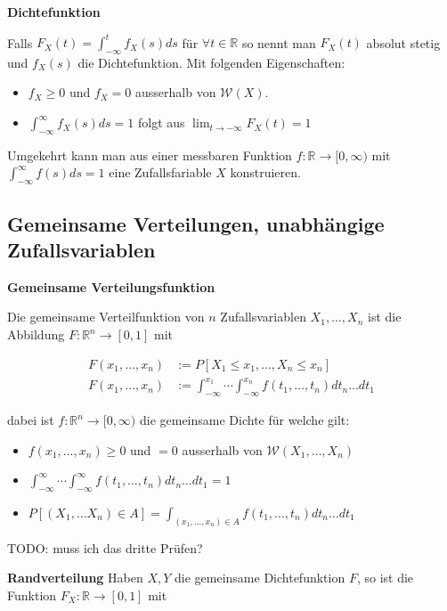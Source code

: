 \documentclass[25pt]{sciposter}
\newcommand{\R}{\mathbb{R}}
\newcommand{\W}{\mathcal{W}}
\newenvironment{method}[1]{\begin{mdframed}[backgroundcolor=blue!10,innertopmargin=15pt, innerbottommargin=15pt,nobreak=true]
		\textbf{#1 }
	}
	{ 
	\end{mdframed}
}
\begin{document}
\begin{multicols}{3}
\begin{method}{Dichtefunktion}
	Falls $F_X(t) = \int_{-\infty}^t f_X(s) ds$ für $\forall t\in\R$ so nennt man $F_X(t)$ absolut stetig und $f_X(s)$ die Dichtefunktion. Mit folgenden Eigenschaften:
	\begin{itemize}
		\item $f_X \geq 0$ und $f_X = 0$ ausserhalb von $\W(X)$.
		\item $\int_{-\infty}^\infty f_X(s) ds = 1$ folgt aus $\lim_{t \to -\infty}F_X(t) = 1$
	\end{itemize}

Umgekehrt kann man aus einer messbaren Funktion $f:\R\to[0,\infty)$ mit $\int_{-\infty}^\infty f(s)ds = 1$ eine Zufallsfariable $X$ konstruieren.
\end{method}



\subsection*{Gemeinsame Verteilungen, unabhängige Zufallsvariablen}


\begin{method}{Gemeinsame Verteilungsfunktion}
	Die gemeinsame Verteilfunktion von $n$ Zufallsvariablen $X_1,\ldots, X_n$ ist die Abbildung $F:\R^n \to [0,1]$ mit
	
	\begin{align*}
	F(x_1,\ldots,x_n) &:= P[X_1 \leq x_1, \ldots , X_n \leq x_n]\\
	F(x_1,\ldots,x_n) &:= \int_{-\infty}^{x_1}\cdots \int_{-\infty}^{x_n}f(t_1,\ldots,t_n)dt_n\ldots dt_1
	\end{align*}
	
	dabei ist $f:\R^n \to [0,\infty)$ die gemeinsame Dichte für welche gilt:
	\begin{itemize}
		\item $f(x_1,\ldots,x_n)\geq 0$ und $=0$ ausserhalb von $\W(X_1,\ldots,X_n)$
		\item $\int_{-\infty}^{\infty}\cdots \int_{-\infty}^{\infty}f(t_1,\ldots,t_n)dt_n\ldots dt_1 = 1$
		\item $P[(X_1,\ldots X_n)\in A] = \int_{(x_1,\ldots,x_n)\in A}f(t_1,\ldots,t_n)dt_n\ldots dt_1$
	\end{itemize} 
	TODO: muss ich das dritte Prüfen?
\end{method}

\begin{method}{Randverteilung} Haben $X,Y$ die gemeinsame Dichtefunktion $F$, so ist die Funktion $F_X : \R \to [0,1]$ mit 
	

\end{method}
\end{multicols}
\end{document}

